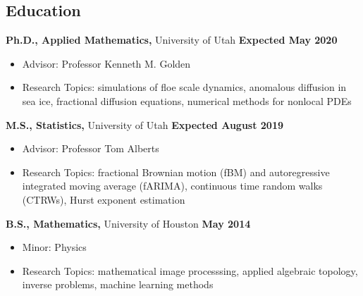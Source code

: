 \documentclass[margin,line]{res}
\begin{document}
\newcommand{\myname}{Huy Dinh}
\newlength{\mynamewidth}
\settowidth{\mynamewidth}{\namefont\myname}

\name{\hspace*{0.5\textwidth}\hspace{-0.5\mynamewidth} \myname \vspace*{.2in}}
\thispagestyle{empty}

\begin{resume}



\section{\sc Education}
{\bf Ph.D., Applied Mathematics,} University of Utah \hfill {\bf Expected May 2020}\\
\vspace*{-.1in}
\begin{itemize} \setlength\itemsep{0em}
\item[ ] Advisor: Professor Kenneth M. Golden
\item[ ] Research Topics: simulations of floe scale dynamics, anomalous diffusion in sea ice, fractional diffusion equations, numerical methods for nonlocal PDEs
\end{itemize}

{\bf M.S., Statistics,} University of Utah \hfill {\bf Expected August 2019}\\
\vspace*{-.1in}
\begin{itemize} \setlength\itemsep{0em}
\item[ ] Advisor: Professor Tom Alberts
\item[ ] Research Topics: fractional Brownian motion (fBM) and autoregressive integrated moving average (fARIMA), continuous time random walks (CTRWs), Hurst exponent estimation
\end{itemize}

{\bf B.S., Mathematics,} University of Houston \hfill {\bf May 2014}\\
\vspace*{-.1in}
\begin{itemize} \setlength\itemsep{0em}
\item[ ] Minor: Physics
\item[ ] Research Topics: mathematical image processsing, applied algebraic topology, inverse problems, machine learning methods
\end{itemize}


\end{resume}
\end{document}

